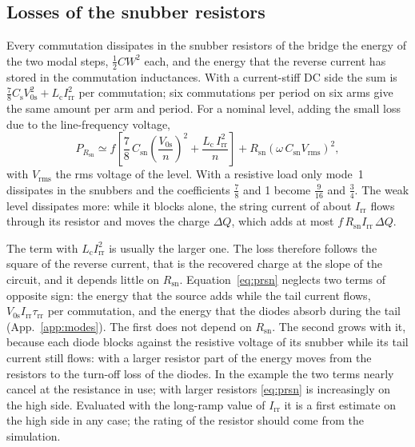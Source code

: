 \documentclass[10pt,a4paper]{scrartcl}
\newcommand{\Irr}{I_\mathrm{rr}}
\newcommand{\Csn}{C_\mathrm{sn}}
\newcommand{\Rsn}{R_\mathrm{sn}}
\newcommand{\Cs}{C_\mathrm{s}}
\newcommand{\Lc}{L_\mathrm{c}}
\newcommand{\Vos}{V_\mathrm{0s}}
\newcommand{\trr}{\tau_\mathrm{rr}}
\begin{document}
\subsection{Losses of the snubber resistors}
\label{sec:prsn}
Every commutation dissipates in the snubber resistors of the bridge the energy of the two modal steps, $\tfrac12 C W^2$ each, and the energy that the reverse current has stored in the commutation inductances. With a current-stiff DC side the sum is $\tfrac78\Cs\Vos^2 + \Lc\Irr^2$ per commutation; six commutations per period on six arms give the same amount per arm and period. For a nominal level, adding the small loss due to the line-frequency voltage,
\begin{equation}
P_{\Rsn} \simeq f\left[\frac78\,\Csn\left(\frac{\Vos}{n}\right)^2 + \frac{\Lc\,\Irr^2}{n}\right] + \Rsn\left(\omega\,\Csn V_\mathrm{rms}\right)^2 ,
\label{eq:prsn}
\end{equation}
with $V_\mathrm{rms}$ the rms voltage of the level. With a resistive load only mode~1 dissipates in the snubbers and the coefficients $\tfrac78$ and 1 become $\tfrac9{16}$ and $\tfrac34$. The weak level dissipates more: while it blocks alone, the string current of about $\Irr$ flows through its resistor and moves the charge $\Delta Q$, which adds at most $f\,\Rsn\Irr\,\Delta Q$.

The term with $\Lc\Irr^2$ is usually the larger one. The loss therefore follows the square of the reverse current, that is the recovered charge at the slope of the circuit, and it depends little on $\Rsn$. Equation~\eqref{eq:prsn} neglects two terms of opposite sign: the energy that the source adds while the tail current flows, $\Vos\Irr\trr$ per commutation, and the energy that the diodes absorb during the tail (App.~\ref{app:modes}). The first does not depend on $\Rsn$. The second grows with it, because each diode blocks against the resistive voltage of its snubber while its tail current still flows: with a larger resistor part of the energy moves from the resistors to the turn-off loss of the diodes. In the example the two terms nearly cancel at the resistance in use; with larger resistors \eqref{eq:prsn} is increasingly on the high side. Evaluated with the long-ramp value of $\Irr$ it is a first estimate on the high side in any case; the rating of the resistor should come from the simulation.
\end{document}
